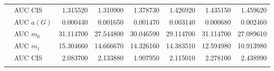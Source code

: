 \begin{table}[htbp]
\begin{tabular}{llrrrrrr}
    & AUC CIS & 1.315520 & 1.310900 & 1.378730 & 1.426920 & 1.435150 & 1.459620 \\
    \addlinespace
    \multirow{4}{*}{random} & AUC $a(G)$ & 0.000440 & 0.001650 & 0.001470 & 0.003140 & 0.000680 & 0.002460 \\
    & AUC $m_0$ & 31.114700 & 27.544800 & 30.046590 & 29.114700 & 31.114700 & 27.089610 \\
    & AUC $m_1$ & 15.304660 & 14.666670 & 14.326160 & 14.383510 & 12.594980 & 10.913980 \\
    & AUC CIS & 2.083700 & 2.133880 & 1.907950 & 2.115010 & 2.278100 & 2.438990 \\
    \addlinespace
    \bottomrule
  \end{tabular}
\end{table}

